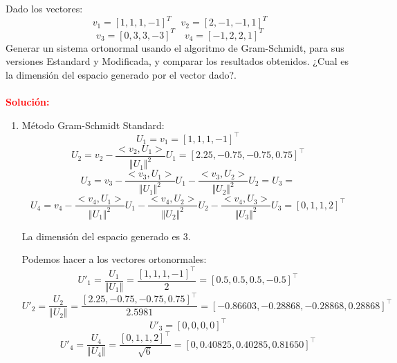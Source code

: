 Dado los vectores:
\[
    v_1 = [1, 1, 1, -1]^T   \quad v_2 = [2, -1, -1, 1]^T
\]
\[
    v_3 = [0, 3, 3, -3]^T   \quad v_4 = [-1, 2, 2, 1]^T
\]
Generar un sistema ortonormal usando el algoritmo de Gram-Schmidt, para sus versiones Estandard y Modificada, y comparar
los resultados obtenidos. ¿Cual es la dimensión del espacio generado por el vector dado?.\\\\

\noindent \textcolor{red}{\bf Solución:}

\begin{enumerate}[label=(\alph*)]

\item Método Gram-Schmidt Standard:
\begin{equation}
    U_1 = v_1 =  [1, 1, 1, -1]^\intercal 
\end{equation}
\begin{equation}
    U_2 = v_2 - \frac{<v_2,U_1>}{\Vert{U_1}\Vert^2}U_1 = [2.25, -0.75, -0.75, 0.75]^\intercal 
\end{equation}
\begin{equation}
    U_3 = v_3 - \frac{<v_3,U_1>}{\Vert{U_1}\Vert^2}U_1 - \frac{<v_3,U_2>}{\Vert{U_2}\Vert^2}U_2 = U_3 = 
\end{equation}
\begin{equation}
    U_4 = v_4 - \frac{<v_4,U_1>}{\Vert{U_1}\Vert^2} U_1 
              - \frac{<v_4,U_2>}{\Vert{U_2}\Vert^2} U_2 
              - \frac{<v_4,U_3>}{\Vert{U_3}\Vert^2} U_3 = [0, 1, 1, 2]^\intercal 
\end{equation}

La dimensión del espacio generado es $3$.

Podemos hacer a los vectores ortonormales:
\begin{equation}
    U'_1 = \frac{U_1}{\Vert U_1 \Vert} =  \frac{[1, 1, 1, -1]^\intercal }{2} = [0.5, 0.5, 0.5,-0.5]^\intercal 
\end{equation}
\begin{equation}
    U'_2 =  \frac{U_2}{\Vert U_2 \Vert} =  \frac{[2.25, -0.75, -0.75, 0.75]^\intercal }{2.5981} = [-0.86603, -0.28868, -0.28868, 0.28868]^\intercal 
\end{equation}
\begin{equation}
    U'_3 = [0, 0, 0, 0]^\intercal 
\end{equation}
\begin{equation}
    U'_4 = \frac{U_4}{\Vert U_4 \Vert}  = \frac{[0, 1, 1, 2]^\intercal}{\sqrt{6}}=[0, 0.40825, 0.40285, 0.81650]^\intercal 
\end{equation}


\end{enumerate}
